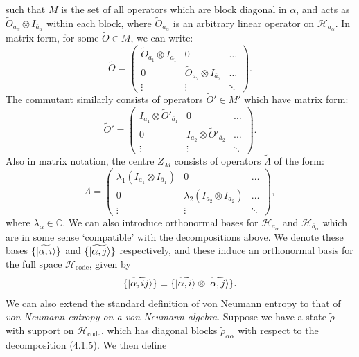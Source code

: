 \documentclass[12pt,a4paper]{report}
\numberwithin{equation}{section}
\newcommand{\Hcode}{\mathcal{H}_{\text{code}}}
\newcommand{\ol}[1]{\overline{#1}}
\theoremstyle{definition}
\theoremstyle{theorem}
\theoremstyle{theorem}
\theoremstyle{example}
\theoremstyle{definition}
\begin{document}
such that $M$ is the set of all operators which are block diagonal in $\alpha$, and acts as $\tilde{O}_{a_{\alpha}}\otimes I_{\ol{a}_{\alpha}}$ within each block, where $\tilde{O}_{a_{\alpha}}$ is an arbitrary linear operator on $\mathcal{H}_{a_{\alpha}}$. In matrix form, for some $\tilde{O}\in M$, we can write:
\begin{equation}
	\tilde{O}=\begin{pmatrix}
		\tilde{O}_{a_{1}}\otimes I_{\ol{a}_{1}}&0&\dots\\
		0&\tilde{O}_{a_{2}}\otimes I_{\ol{a}_{2}}&\dots\\
		\vdots&\vdots&\ddots
	\end{pmatrix}.
\end{equation}
The commutant similarly consists of operators $\tilde{O}'\in M'$ which have matrix form:
\begin{equation}
	\tilde{O}'=\begin{pmatrix}
		I_{a_{1}}\otimes\tilde{O}'_{\ol{a}_{1}}&0&\dots\\
		0&I_{a_{2}}\otimes\tilde{O}'_{\ol{a}_{2}}&\dots\\
		\vdots&\vdots&\ddots
	\end{pmatrix}.
\end{equation}
Also in matrix notation, the centre $Z_{M}$ consists of operators $\tilde{\Lambda}$ of the form:
\begin{equation}
	\tilde{\Lambda}=\begin{pmatrix}
		\lambda_{1}(I_{a_{1}}\otimes I_{\ol{a}_{1}})&0&\dots\\
		0&\lambda_{2}(I_{a_{2}}\otimes I_{\ol{a}_{2}})&\dots\\
		\vdots&\vdots&\ddots
	\end{pmatrix},
\end{equation}
where $\lambda_{\alpha}\in\mathbb{C}$. We can also introduce orthonormal bases for $\mathcal{H}_{a_{\alpha}}$ and $\mathcal{H}_{\ol{a}_{\alpha}}$ which are in some sense `compatible' with the decompositions above. We denote these bases $\{\ket{\widetilde{\alpha,i}}\}$ and $\{\ket{\widetilde{\alpha,j}}\}$ respectively, and these induce an orthonormal basis for the full space $\Hcode$, given by
\begin{equation}
	\{\ket{\widetilde{\alpha,ij}}\}\equiv\{\ket{\widetilde{\alpha,i}}\otimes\ket{\widetilde{\alpha,j}}\}.
\end{equation}
We can also extend the standard definition of von Neumann entropy to that of \textit{von Neumann entropy on a von Neumann algebra}. Suppose we have a state $\tilde{\rho}$ with support on $\Hcode$, which has diagonal blocks $\tilde{\rho}_{\alpha\alpha}$ with respect to the decomposition (4.1.5). We then define
\end{document}
